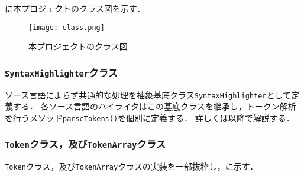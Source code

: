 \documentclass[autodetect-engine,dvi=dvipdfmx,ja=standard,
               a4j,11pt]{bxjsarticle}
\newcommand{\figref}[1]{\makebox{図~\ref{#1}}}
\newcommand{\subsecref}[1]{\makebox{第~\ref{#1}~節}}
\begin{document}
\figref{img:class}に本プロジェクトのクラス図を示す．

\begin{figure}[ht]
\centering
\texttt{[image: class.png]}
\caption{{本プロジェクトのクラス図}}
\label{img:class}
\end{figure}

\subsubsection{{\tt SyntaxHighlighter}クラス}

ソース言語によらず共通的な処理を抽象基底クラス\verb|SyntaxHighlighter|として定義する．
各ソース言語のハイライタはこの基底クラスを継承し，トークン解析を行うメソッド\verb|parseTokens()|を個別に定義する．
詳しくは\subsecref{sec:highlighterClass}以降で解説する．

\subsubsection{{\tt Token}クラス，及び{\tt TokenArray}クラス}

{\tt Token}クラス，及び{\tt TokenArray}クラスの実装を一部抜粋し，\figref{prog:token}に示す．
\end{document}
